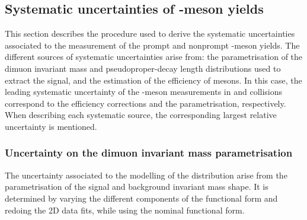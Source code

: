 \subsection{Systematic uncertainties of \texorpdfstring{\JPsi}{J/psi}-meson yields}\label{sec:Charmonia_Analysis_JPsiYieldSystematics}

This section describes the procedure used to derive the systematic uncertainties associated to the measurement of the prompt and nonprompt \JPsi-meson yields. The different sources of systematic uncertainties arise from: the parametrisation of the dimuon invariant mass and pseudoproper-decay length  distributions used to extract the signal, and the estimation of the efficiency of \JPsi mesons. In this case, the leading systematic uncertainty of the \JPsi-meson measurements in \Runpp and \RunPbPb collisions correspond to the \tnp efficiency corrections and the \ctau parametrisation, respectively. When describing each systematic source, the corresponding largest relative uncertainty is mentioned.

\subsubsection{Uncertainty on the dimuon invariant mass parametrisation}\label{sec:Charmonia_Analysis_JPsiYieldSystematics_InvMass}

The uncertainty associated to the modelling of the \mMuMu distribution arise from the parametrisation of the signal and background invariant mass shape. It is determined by varying the different components of the \mMuMu functional form and redoing the 2D data fits, while using the nominal \ctau functional form.

